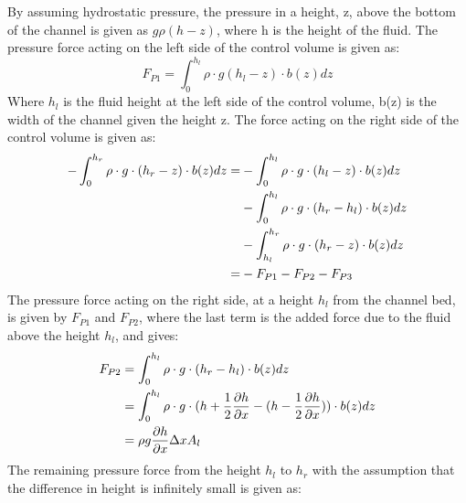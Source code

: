 By assuming hydrostatic pressure, the pressure in a height, z, above the bottom of the channel is given as $g\rho(h-z)$, where h is the height of the fluid.  
The pressure force acting on the left side of the control volume is given as:
\begin{equation}\label{eq:P1}
	F_{P1} = \int_{0}^{h_l} \rho \cdot g (h_l - z)\cdot b(z) dz
\end{equation}
Where $h_l$ is the fluid height at the left side of the control volume, b(z) is the width of the channel given the height z. The force acting on the right side of the control volume is given as:
\begin{equation}\label{eq:P2}
\begin{aligned}
	-\int_{0}^{h_r} \rho \cdot g \cdot(h_r - z)\cdot b(z)dz = 
	&-\int_{0}^{h_l} \rho \cdot g \cdot(h_l - z)\cdot b(z)dz \vspace{2mm}\\ 
	&-\int_{0}^{h_l} \rho \cdot g \cdot(h_r- h_l)\cdot b(z)dz \vspace{2mm}\\
	&-\int_{h_l}^{h_r} \rho \cdot g \cdot(h_r - z)\cdot b(z)dz \vspace{4mm}\\
	=&-F_{P1} - F_{P2} - F_{P3}
\end{aligned}	
\end{equation}
The pressure force acting on the right side, at a height $h_l$ from the channel bed, is given by $F_{P1}$ and $F_{P2}$, where the last term is the added force due to the fluid above the height $h_l$, and gives:  
\begin{equation}
\begin{aligned}
	F_{P2} &= \int_{0}^{h_l} \rho \cdot g \cdot (h_r - h_l)\cdot b(z)dz \vspace{2mm}\\
	&=  \int_{0}^{h_l} \rho \cdot g \cdot (h + \frac{1}{2} \frac{\partial h}{\partial x} - (h - \frac{1}{2} \frac{\partial h}{\partial x}))\cdot b(z)dz \vspace{2mm}\\
	&= \rho g \frac{\partial h}{\partial x}\Delta x A_l
\end{aligned}
\end{equation}
The remaining pressure force from the height $h_l$ to $h_r$ with the assumption that the difference in height is infinitely small is given as:
